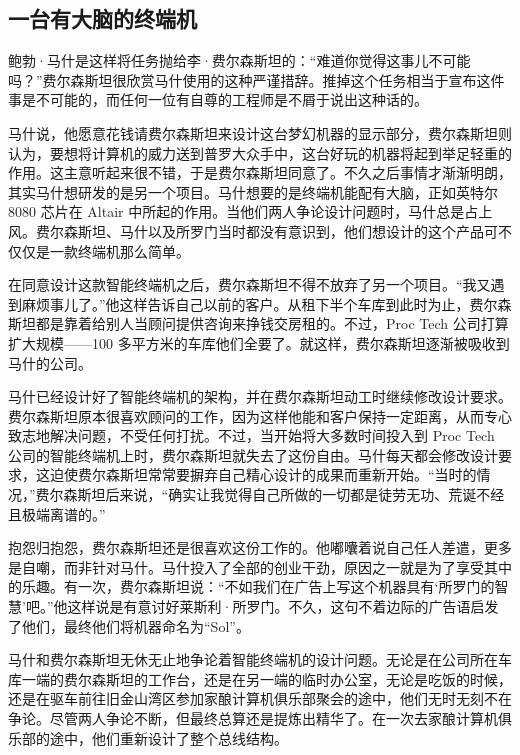 \documentclass[12pt,UTF8]{ctexbook}
\begin{document}
\subsection{一台有大脑的终端机}


鲍勃·马什是这样将任务抛给李·费尔森斯坦的：“难道你觉得这事儿不可能吗？”费尔森斯坦很欣赏马什使用的这种严谨措辞。推掉这个任务相当于宣布这件事是不可能的，而任何一位有自尊的工程师是不屑于说出这种话的。

马什说，他愿意花钱请费尔森斯坦来设计这台梦幻机器的显示部分，费尔森斯坦则认为，要想将计算机的威力送到普罗大众手中，这台好玩的机器将起到举足轻重的作用。这主意听起来很不错，于是费尔森斯坦同意了。不久之后事情才渐渐明朗，其实马什想研发的是另一个项目。马什想要的是终端机能配有大脑，正如英特尔 8080 芯片在 Altair 中所起的作用。当他们两人争论设计问题时，马什总是占上风。费尔森斯坦、马什以及所罗门当时都没有意识到，他们想设计的这个产品可不仅仅是一款终端机那么简单。

在同意设计这款智能终端机之后，费尔森斯坦不得不放弃了另一个项目。“我又遇到麻烦事儿了。”他这样告诉自己以前的客户。从租下半个车库到此时为止，费尔森斯坦都是靠着给别人当顾问提供咨询来挣钱交房租的。不过，Proc Tech 公司打算扩大规模——100 多平方米的车库他们全要了。就这样，费尔森斯坦逐渐被吸收到马什的公司。

马什已经设计好了智能终端机的架构，并在费尔森斯坦动工时继续修改设计要求。费尔森斯坦原本很喜欢顾问的工作，因为这样他能和客户保持一定距离，从而专心致志地解决问题，不受任何打扰。不过，当开始将大多数时间投入到 Proc Tech 公司的智能终端机上时，费尔森斯坦就失去了这份自由。马什每天都会修改设计要求，这迫使费尔森斯坦常常要摒弃自己精心设计的成果而重新开始。“当时的情况，”费尔森斯坦后来说，“确实让我觉得自己所做的一切都是徒劳无功、荒诞不经且极端离谱的。”

抱怨归抱怨，费尔森斯坦还是很喜欢这份工作的。他嘟囔着说自己任人差遣，更多是自嘲，而非针对马什。马什投入了全部的创业干劲，原因之一就是为了享受其中的乐趣。有一次，费尔森斯坦说：“不如我们在广告上写这个机器具有‘所罗门的智慧’吧。”他这样说是有意讨好莱斯利·所罗门。不久，这句不着边际的广告语启发了他们，最终他们将机器命名为“Sol”。

马什和费尔森斯坦无休无止地争论着智能终端机的设计问题。无论是在公司所在车库一端的费尔森斯坦的工作台，还是在另一端的临时办公室，无论是吃饭的时候，还是在驱车前往旧金山湾区参加家酿计算机俱乐部聚会的途中，他们无时无刻不在争论。尽管两人争论不断，但最终总算还是提炼出精华了。在一次去家酿计算机俱乐部的途中，他们重新设计了整个总线结构。
\end{document}
